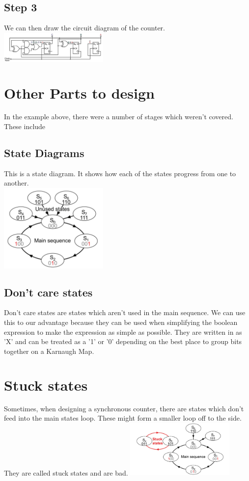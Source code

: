 \documentclass[a4paper, 11pt, twocolumn]{article}
\begin{document}
\subsection{Step 3}
We can then draw the circuit diagram of the counter.\\
\includegraphics[width=0.4\textwidth]{step2.jpg}

\section{Other Parts to design}
In the example above, there were a number of stages which weren't covered. These include
\subsection{State Diagrams}
This is a state diagram. It shows how each of the states progress from one to another.\\
\includegraphics[width=0.4\textwidth]{state.jpg}

\subsection{Don't care states}
Don't care states are states which aren't used in the main sequence. We can use this to our advantage because they can be used when simplifying the boolean expression to make the expression as simple as possible. They are written in as 'X' and can be treated as a '1' or '0' depending on the best place to group bits together on a Karnaugh Map.

\section{Stuck states}
Sometimes, when designing a synchronous counter, there are states which don't feed into the main states loop. These might form a smaller loop off to the side. They are called stuck states and are bad.\newline
\includegraphics[width=0.4\textwidth]{stuckStates.jpg}
\end{document}
